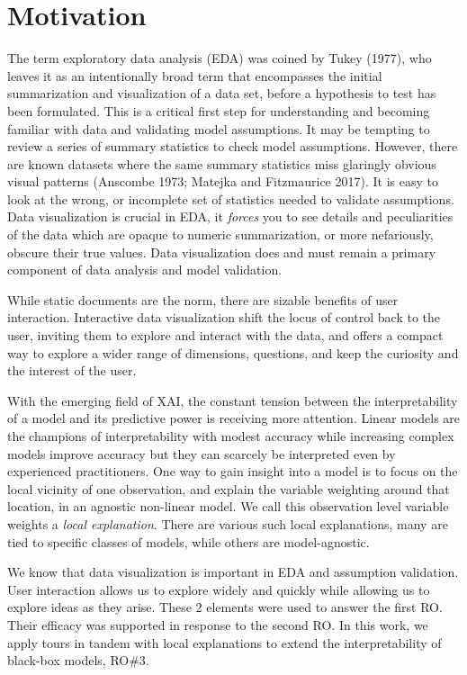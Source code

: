 \documentclass[
  11,
]{article}
\begin{document}
\hypertarget{motivation}{%
\section{Motivation}\label{motivation}}

The term exploratory data analysis (EDA) was coined by Tukey (1977), who leaves it as an intentionally broad term that encompasses the initial summarization and visualization of a data set, before a hypothesis to test has been formulated. This is a critical first step for understanding and becoming familiar with data and validating model assumptions. It may be tempting to review a series of summary statistics to check model assumptions. However, there are known datasets where the same summary statistics miss glaringly obvious visual patterns (Anscombe 1973; Matejka and Fitzmaurice 2017). It is easy to look at the wrong, or incomplete set of statistics needed to validate assumptions. Data visualization is crucial in EDA, it \emph{forces} you to see details and peculiarities of the data which are opaque to numeric summarization, or more nefariously, obscure their true values. Data visualization does and must remain a primary component of data analysis and model validation.

While static documents are the norm, there are sizable benefits of user interaction. Interactive data visualization shift the locus of control back to the user, inviting them to explore and interact with the data, and offers a compact way to explore a wider range of dimensions, questions, and keep the curiosity and the interest of the user.

With the emerging field of XAI, the constant tension between the interpretability of a model and its predictive power is receiving more attention. Linear models are the champions of interpretability with modest accuracy while increasing complex models improve accuracy but they can scarcely be interpreted even by experienced practitioners. One way to gain insight into a model is to focus on the local vicinity of one observation, and explain the variable weighting around that location, in an agnostic non-linear model. We call this observation level variable weights a \emph{local explanation}. There are various such local explanations, many are tied to specific classes of models, while others are model-agnostic.

We know that data visualization is important in EDA and assumption validation. User interaction allows us to explore widely and quickly while allowing us to explore ideas as they arise. These 2 elements were used to answer the first RO. Their efficacy was supported in response to the second RO. In this work, we apply tours in tandem with local explanations to extend the interpretability of black-box models, RO\#3.
\end{document}
